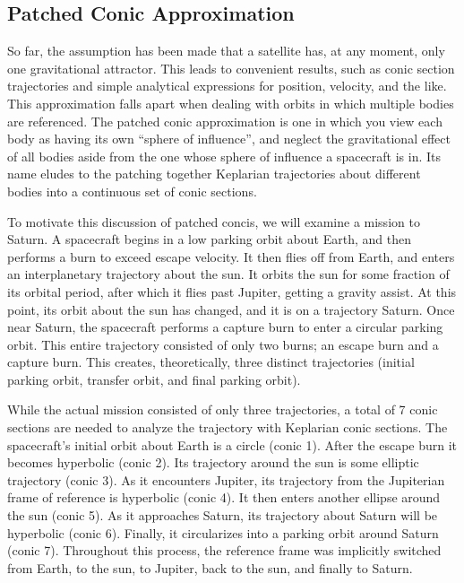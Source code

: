 \documentclass[../basicOrbitalDynamics.tex]{subfiles}
\begin{document}
\bigskip\bigskip
\subsection{Patched Conic Approximation}\label{sec:Patched Conics}

So far, the assumption has been made that a satellite has, at any moment, only one gravitational attractor. This leads to convenient results, such as conic section trajectories and simple analytical expressions for position, velocity, and the like. This approximation falls apart when dealing with orbits in which multiple bodies are referenced. The patched conic approximation is one in which you view each body as having its own ``sphere of influence'', and neglect the gravitational effect of all bodies aside from the one whose sphere of influence a spacecraft is in. Its name eludes to the patching together Keplarian trajectories about different bodies into a continuous set of conic sections.

To motivate this discussion of patched concis, we will examine a mission to Saturn. A spacecraft begins in a low parking orbit about Earth, and then performs a burn to exceed escape velocity. It then flies off from Earth, and enters an interplanetary trajectory about the sun. It orbits the sun for some fraction of its orbital period, after which it flies past Jupiter, getting a gravity assist. At this point, its orbit about the sun has changed, and it is on a trajectory Saturn. Once near Saturn, the spacecraft performs a capture burn to enter a circular parking orbit. This entire trajectory consisted of only two burns; an escape burn and a capture burn. This creates, theoretically, three distinct trajectories (initial parking orbit, transfer orbit, and final parking orbit).

While the actual mission consisted of only three trajectories, a total of 7 conic sections are needed to analyze the trajectory with Keplarian conic sections. The spacecraft's initial orbit about Earth is a circle (conic 1). After the escape burn it becomes hyperbolic (conic 2). Its trajectory around the sun is some elliptic trajectory (conic 3). As it encounters Jupiter, its trajectory from the Jupiterian frame of reference is hyperbolic (conic 4). It then enters another ellipse around the sun (conic 5). As it approaches Saturn, its trajectory about Saturn will be hyperbolic (conic 6). Finally, it circularizes into a parking orbit around Saturn (conic 7). Throughout this process, the reference frame was implicitly switched from Earth, to the sun, to Jupiter, back to the sun, and finally to Saturn.
\end{document}
